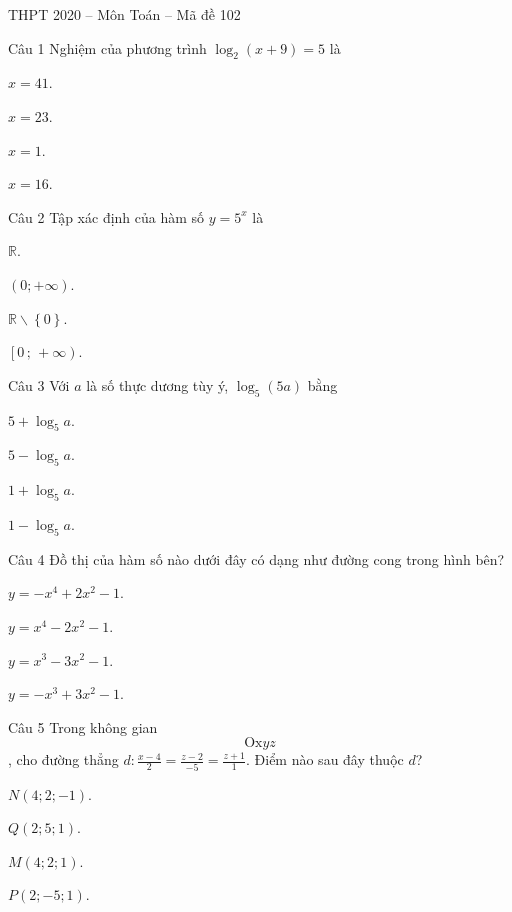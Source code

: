 \documentclass{book}
\begin{document}
\begin{quiz}{THPT 2020 – Môn Toán – Mã đề 102}

\begin{multi}[points=1]{Câu 1}
 Nghiệm của phương trình ${{\log }_{2}}\left( x+9 \right)=5$ là

\item  $x=41$.	
\item*  $x=23$.	
\item  $x=1$.	
\item  $x=16$.
\end{multi}

\begin{multi}[points=1]{Câu 2}
 Tập xác định của hàm số $y={{5}^{x}}$ là

\item*  $\mathbb{R}$.	
\item  $\left( 0;+\infty  \right)$.	
\item  $\mathbb{R}\backslash \left\{ 0 \right\}$.	
\item  $\left[ 0\,;\,+\infty  \right)$.
\end{multi}

\begin{multi}[points=1]{Câu 3}
 Với $a$ là số thực dương tùy ý, ${{\log }_{5}}\left( 5a \right)$ bằng

\item  $5+{{\log }_{5}}a$.	
\item  $5-{{\log }_{5}}a$.	
\item*  $1+{{\log }_{5}}a$.	
\item  $1-{{\log }_{5}}a$.
\end{multi}

\begin{multi}[points=1]{Câu 4}
 Đồ thị của hàm số nào dưới đây có dạng như đường cong trong hình bên? 

\item  $y=-{{x}^{4}}+2{{x}^{2}}-1$.	
\item  $y={{x}^{4}}-2{{x}^{2}}-1$.	
\item  $y={{x}^{3}}-3{{x}^{2}}-1$.	
\item*  $y=-{{x}^{3}}+3{{x}^{2}}-1$.
\end{multi}

\begin{multi}[points=1]{Câu 5}
 Trong không gian \[\text{Ox}yz\], cho đường thẳng $d:\frac{x-4}{2}=\frac{z-2}{-5}=\frac{z+1}{1}$. Điểm nào sau đây thuộc $d$?

\item*  $N(4;2;-1)$.	
\item  $Q(2;5;1)$.	
\item  $M(4;2;1)$.	
\item  $P(2;-5;1)$.
\end{multi}


\end{quiz}
\end{document}

